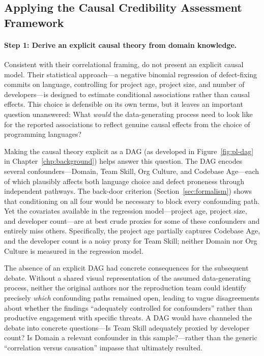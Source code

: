 \subsection{Applying the Causal Credibility Assessment Framework}
\label{sec:proposed-assessment}

\paragraph{Step 1: Derive an explicit causal theory from domain knowledge.}
Consistent with their correlational framing, \citet{DBLP:conf/sigsoft/RayPFD14} do not present an explicit causal model.
Their statistical approach---a negative binomial regression of defect-fixing commits on language, controlling for project age, project size, and number of developers---is designed to estimate conditional associations rather than causal effects.
This choice is defensible on its own terms, but it leaves an important question unanswered: What \emph{would} the data-generating process need to look like for the reported associations to reflect genuine causal effects from the choice of programming languages?

Making the causal theory explicit as a DAG (as developed in Figure~\ref{fig:pl-dag} in Chapter~\ref{chp:background}) helps answer this question.
The DAG encodes several confounders---Domain, Team Skill, Org Culture, and Codebase Age---each of which plausibly affects both language choice and defect proneness through independent pathways.
The back-door criterion (Section~\ref{sec:formalism}) shows that conditioning on all four would be necessary to block every confounding path.
Yet the covariates available in the regression model---project age, project size, and developer count---are at best crude proxies for some of these confounders and entirely miss others.
Specifically, the project age partially captures Codebase Age, and the developer count is a noisy proxy for Team Skill;  neither Domain nor Org Culture is measured in the regression model.

The absence of an explicit DAG had concrete consequences for the subsequent debate.
Without a shared visual representation of the assumed data-generating process, neither the original authors nor the reproduction team could identify precisely \emph{which} confounding paths remained open, leading to vague disagreements about whether the findings ``adequately controlled for confounders'' rather than productive engagement with specific threats.
A DAG would have channeled the debate into concrete questions---Is Team Skill adequately proxied by developer count? Is Domain a relevant confounder in this sample?---rather than the generic ``correlation versus causation'' impasse that ultimately resulted.

